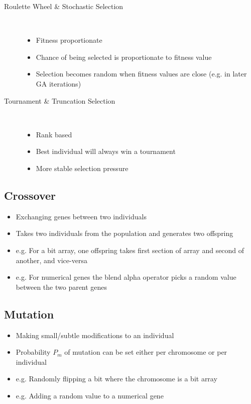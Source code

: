 \documentclass[a4paper]{article}
\begin{document}
\begin{description}
  \item[Roulette Wheel \& Stochastic Selection] \hfill \\
    \begin{itemize}
      \item Fitness proportionate
      \item Chance of being selected is proportionate to fitness value
      \item Selection becomes random when fitness values are close (e.g. in
            later GA iterations)
    \end{itemize}

  \item[Tournament \& Truncation Selection] \hfill \\
    \begin{itemize}
      \item Rank based
      \item Best individual will always win a tournament
      \item More stable selection pressure
    \end{itemize}

\end{description}

\subsection{Crossover}

\begin{itemize}
  \item Exchanging genes between two individuals
  \item Takes two individuals from the population and generates two offspring
  \item e.g. For a bit array, one offspring takes first section of array and
        second of another, and vice-versa
  \item e.g. For numerical genes the blend alpha operator picks a random value
        between the two parent genes
\end{itemize}

\subsection{Mutation}

\begin{itemize}
  \item Making small/subtle modifications to an individual
  \item Probability $P_{m}$ of mutation can be set either per chromosome or per
        individual
  \item e.g. Randomly flipping a bit where the chromosome is a bit array
  \item e.g. Adding a random value to a numerical gene
\end{itemize}
\end{document}
